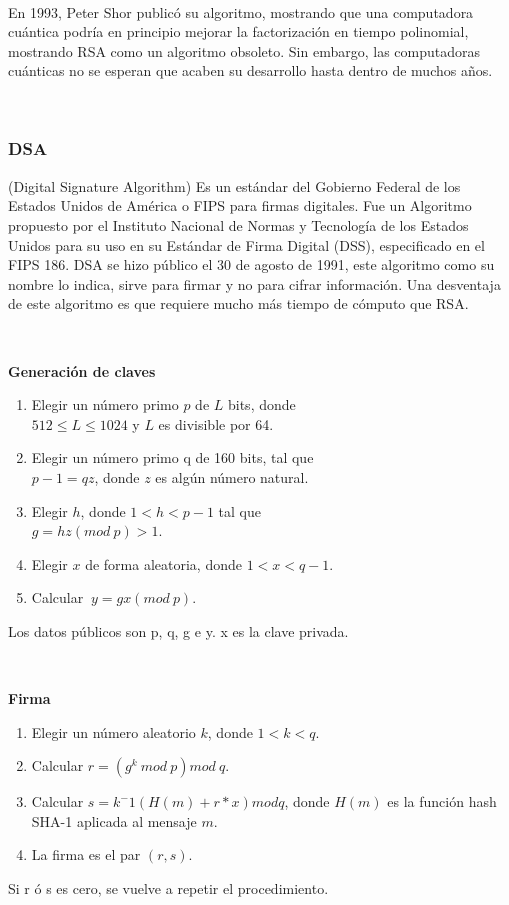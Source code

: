\documentclass[11pt, conference]{IEEEtran}
\begin{document}
\

En 1993, Peter Shor publicó su algoritmo, mostrando que una computadora cuántica podría en principio mejorar la factorización en tiempo polinomial, mostrando RSA como un algoritmo obsoleto. Sin embargo, las computadoras cuánticas no se esperan que acaben su desarrollo hasta dentro de muchos años.

\

\subsubsection{DSA}
(Digital Signature Algorithm) Es un estándar del Gobierno Federal de los Estados Unidos de América o FIPS para firmas digitales. Fue un Algoritmo propuesto por el Instituto Nacional de Normas y Tecnología de los Estados Unidos para su uso en su Estándar de Firma Digital (DSS), especificado en el FIPS 186. DSA se hizo público el 30 de agosto de 1991, este algoritmo como su nombre lo indica, sirve para firmar y no para cifrar información. Una desventaja de este algoritmo es que requiere mucho más tiempo de cómputo que RSA.

\

\textbf{Generación de claves}
\begin{enumerate}
\item Elegir un número primo $p$ de $L$ bits, donde \\$512 \leq L \leq 1024$ y $L$ es divisible por 64.
\item Elegir un número primo q de 160 bits, tal que \\$p-1=qz$, donde $z$ es algún número natural.
\item Elegir $h$, donde $1<h<p-1$ tal que\\ $g=hz(mod\ p)>1$.
\item Elegir $x$ de forma aleatoria, donde $1<x<q-1$.
\item Calcular $~y=gx(mod\ p)$.
\end{enumerate}
Los datos públicos son p, q, g e y. x es la clave privada.

\

\textbf{Firma}
\begin{enumerate}
\item Elegir un número aleatorio $k$, donde $1 < k < q$.
\item Calcular $r = (g^k\ mod\ p)mod\ q$.
\item Calcular $s = k^-1(H(m)+r*x) mod q$, donde $H(m)$ es la función hash SHA-1 aplicada al mensaje $m$.
\item La firma es el par $(r, s)$.
\end{enumerate}
Si r ó s es cero, se vuelve a repetir el procedimiento.
\end{document}
